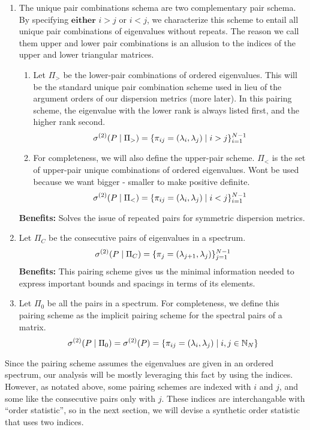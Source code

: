 \begin{enumerate}
  \item The unique pair combinations schema are two complementary pair schema. By specifying $\textbf{either}$ $i > j$ or $i < j$, we characterize this scheme to entail all unique pair combinations of eigenvalues without repeats. The reason we call them upper and lower pair combinations is an allusion to the indices of the upper and lower triangular matrices. \begin{enumerate}
    \item Let $\Pi_>$ be the lower-pair combinations of ordered eigenvalues. This will be the standard unique pair combination scheme used in lieu of the argument orders of our dispersion metrics (more later). In this pairing scheme, the eigenvalue with the lower rank is always listed first, and the higher rank second.
    $${\sigma^{(2)}}(P \mid \Pi_>) = \{\pi_{ij} = (\lambda_i,\lambda_j) \mid i > j\}_{i = 1}^{N-1}$$
    \item For completeness, we will also define the upper-pair scheme. $\Pi_<$ is the set of upper-pair unique combinations of ordered eigenvalues. Wont be used because we want bigger - smaller to make positive definite.
    $${\sigma^{(2)}}(P \mid \Pi_<) = \{\pi_{ij} = (\lambda_i,\lambda_j) \mid i < j\}_{i = 1}^{N-1}$$
  \end{enumerate} 
  \textbf{Benefits:} Solves the issue of repeated pairs for symmetric dispersion metrics.  
\item Let $\Pi_C$ be the consecutive pairs of eigenvalues in a spectrum. 
  $${\sigma^{(2)}}(P \mid \Pi_C) = \{\pi_{j} = (\lambda_{j + 1},\lambda_j)\}_{j = 1}^{N-1}$$
  \textbf{Benefits:} This pairing scheme gives us the minimal information needed to express important bounds and spacings in terms of its elements. 
  \item Let $\Pi_0$ be all the pairs in a spectrum. For completeness, we define this pairing scheme as the implicit pairing scheme for the spectral pairs of a matrix.
  $${\sigma^{(2)}}(P \mid \Pi_0) = {\sigma^{(2)}}(P) = \{\pi_{ij} = (\lambda_{i},\lambda_j) \mid i,j \in \mathbb{N}_N\}$$
\end{enumerate}

\begin{remark}
Since the pairing scheme assumes the eigenvalues are given in an ordered spectrum, our analysis will be mostly leveraging this fact by using the indices. However, as notated above, some pairing schemes are indexed with $i$ and $j$, and some like the consecutive pairs only with $j$. These indices are interchangable with ``order statistic'', so in the next section, we will devise a synthetic order statistic that uses two indices. 
\end{remark}

